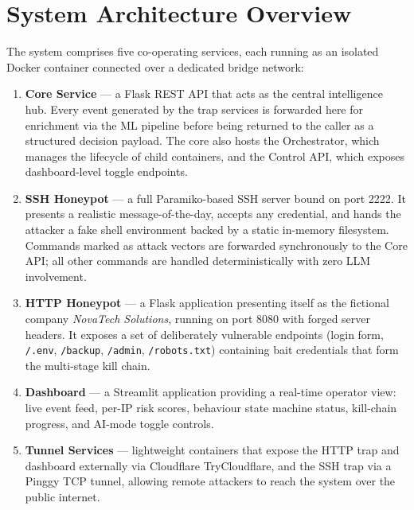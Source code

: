 \section{System Architecture Overview}

The system comprises five co-operating services, each running as an isolated Docker container connected over a dedicated bridge network:

\begin{enumerate}
    \item \textbf{Core Service} — a Flask REST API that acts as the central intelligence hub. Every event generated by the trap services is forwarded here for enrichment via the ML pipeline before being returned to the caller as a structured decision payload. The core also hosts the Orchestrator, which manages the lifecycle of child containers, and the Control API, which exposes dashboard-level toggle endpoints.

    \item \textbf{SSH Honeypot} — a full Paramiko-based \ac{SSH} server bound on port 2222. It presents a realistic message-of-the-day, accepts any credential, and hands the attacker a fake shell environment backed by a static in-memory filesystem. Commands marked as attack vectors are forwarded synchronously to the Core API; all other commands are handled deterministically with zero LLM involvement.

    \item \textbf{HTTP Honeypot} — a Flask application presenting itself as the fictional company \textit{NovaTech Solutions}, running on port 8080 with forged server headers. It exposes a set of deliberately vulnerable endpoints (login form, \texttt{/.env}, \texttt{/backup}, \texttt{/admin}, \texttt{/robots.txt}) containing bait credentials that form the multi-stage kill chain.

    \item \textbf{Dashboard} — a Streamlit application providing a real-time operator view: live event feed, per-IP risk scores, behaviour state machine status, kill-chain progress, and AI-mode toggle controls.

    \item \textbf{Tunnel Services} — lightweight containers that expose the HTTP trap and dashboard externally via Cloudflare TryCloudflare, and the SSH trap via a Pinggy TCP tunnel, allowing remote attackers to reach the system over the public internet.
\end{enumerate}

